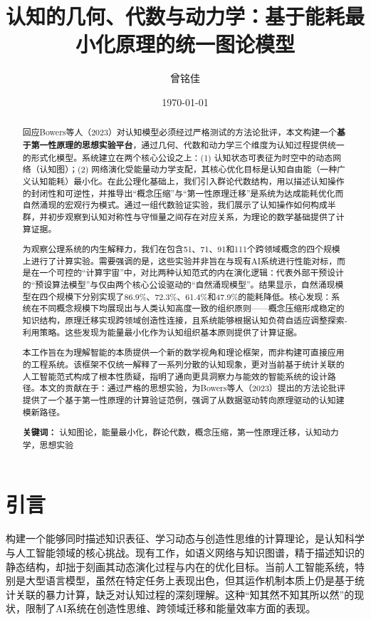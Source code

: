 \documentclass[12pt,a4paper]{article}
\title{认知的几何、代数与动力学：基于能耗最小化原理的统一图论模型}
\author{曾铭佳}
\date{\today}
\begin{document}
\maketitle

\begin{abstract}
回应Bowers等人（2023）对认知模型必须经过严格测试的方法论批评，本文构建一个\textbf{基于第一性原理的思想实验平台}，通过几何、代数和动力学三个维度为认知过程提供统一的形式化模型。系统建立在两个核心公设之上：(1) 认知状态可表征为时空中的动态网络（认知图）；(2) 网络演化受能量动力学支配，其核心优化目标是认知自由能（一种广义认知能耗）最小化。在此公理化基础上，我们引入群论代数结构，用以描述认知操作的封闭性和可逆性，并推导出“概念压缩”与“第一性原理迁移”是系统为达成能耗优化而自然涌现的宏观行为模式。通过一组代数验证实验，我们展示了认知操作如何构成半群，并初步观察到认知对称性与守恒量之间存在对应关系，为理论的数学基础提供了计算证据。

为观察公理系统的内生解释力，我们在包含51、71、91和111个跨领域概念的四个规模上进行了计算实验。需要强调的是，这些实验并非旨在与现有AI系统进行性能对标，而是在一个可控的“计算宇宙”中，对比两种认知范式的内在演化逻辑：代表外部干预设计的“预设算法模型”与仅由两个核心公设驱动的“自然涌现模型”。结果显示，自然涌现模型在四个规模下分别实现了86.9\%、72.3\%、61.4\%和47.9\%的能耗降低。核心发现：系统在不同概念规模下均展现出与人类认知高度一致的组织原则——概念压缩形成稳定的知识结构，原理迁移实现跨领域创造性连接，且系统能够根据认知负荷自适应调整探索-利用策略。这些发现为能量最小化作为认知组织基本原则提供了计算证据。

本工作旨在为理解智能的本质提供一个新的数学视角和理论框架，而非构建可直接应用的工程系统。该框架不仅统一解释了一系列分散的认知现象，更对当前基于统计关联的人工智能范式构成了根本性质疑，指明了通向更具洞察力与能效的智能系统的设计路径。本文的贡献在于：通过严格的思想实验，为Bowers等人（2023）提出的方法论批评提供了一个基于第一性原理的计算验证范例，强调了从数据驱动转向原理驱动的认知建模新路径。

\textbf{关键词：} 认知图论，能量最小化，群论代数，概念压缩，第一性原理迁移，认知动力学，思想实验
\end{abstract}

\newpage
\section{引言}

构建一个能够同时描述知识表征、学习动态与创造性思维的计算理论，是认知科学与人工智能领域的核心挑战。现有工作，如语义网络与知识图谱，精于描述知识的静态结构，却拙于刻画其动态演化过程与内在的优化目标。当前人工智能系统，特别是大型语言模型，虽然在特定任务上表现出色，但其运作机制本质上仍是基于统计关联的暴力计算，缺乏对认知过程的深刻理解。这种“知其然不知其所以然”的现状，限制了AI系统在创造性思维、跨领域迁移和能量效率方面的表现。
\end{document}
